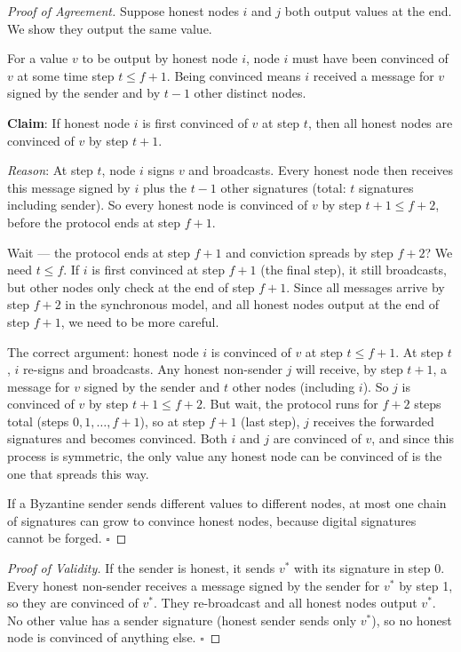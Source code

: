 \documentclass[12pt,a4paper,openany]{book}
\theoremstyle{definition}
\theoremstyle{plain}
\theoremstyle{remark}
\begin{document}
\begin{proof}[Proof of Agreement]
  Suppose honest nodes $i$ and $j$ both output values at the end.  We
  show they output the same value.

  For a value $v$ to be output by honest node $i$, node $i$ must have
  been convinced of $v$ at some time step $t\leq f+1$.  Being convinced
  means $i$ received a message for $v$ signed by the sender and by
  $t-1$ other distinct nodes.

  \textbf{Claim}: If honest node $i$ is first convinced of $v$ at step
  $t$, then all honest nodes are convinced of $v$ by step $t+1$.

  \textit{Reason}: At step $t$, node $i$ signs $v$ and broadcasts.
  Every honest node then receives this message signed by $i$ plus the
  $t-1$ other signatures (total: $t$ signatures including sender).
  So every honest node is convinced of $v$ by step $t+1\leq f+2$,
  before the protocol ends at step $f+1$.

  Wait — the protocol ends at step $f+1$ and conviction spreads by step
  $f+2$?  We need $t\leq f$.  If $i$ is first convinced at step $f+1$
  (the final step), it still broadcasts, but other nodes only check at
  the end of step $f+1$.  Since all messages arrive by step $f+2$ in
  the synchronous model, and all honest nodes output at the end of step
  $f+1$, we need to be more careful.

  The correct argument: honest node $i$ is convinced of $v$ at step
  $t\leq f+1$.  At step $t$, $i$ re-signs and broadcasts.  Any honest
  non-sender $j$ will receive, by step $t+1$, a message for $v$ signed
  by the sender and $t$ other nodes (including $i$).  So $j$ is
  convinced of $v$ by step $t+1\leq f+2$.  But wait, the protocol runs
  for $f+2$ steps total (steps $0, 1, \ldots, f+1$), so at step $f+1$
  (last step), $j$ receives the forwarded signatures and becomes
  convinced.  Both $i$ and $j$ are convinced of $v$, and since this
  process is symmetric, the only value any honest node can be convinced
  of is the one that spreads this way.

  If a Byzantine sender sends different values to different nodes, at
  most one chain of signatures can grow to convince honest nodes, because
  digital signatures cannot be forged.  $\square$
\end{proof}

\begin{proof}[Proof of Validity]
  If the sender is honest, it sends $v^*$ with its signature in step 0.
  Every honest non-sender receives a message signed by the sender for
  $v^*$ by step 1, so they are convinced of $v^*$.  They re-broadcast
  and all honest nodes output $v^*$.  No other value has a sender
  signature (honest sender sends only $v^*$), so no honest node is
  convinced of anything else.  $\square$
\end{proof}
\end{document}
